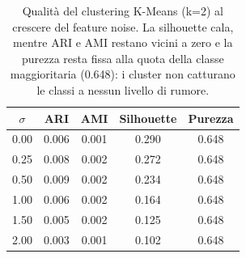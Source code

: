 \begin{table}[H]\centering\small
\caption{Qualità del clustering K-Means (k=2) al crescere del feature noise. La silhouette cala, mentre ARI e AMI restano vicini a zero e la purezza resta fissa alla quota della classe maggioritaria (0.648): i cluster non catturano le classi a nessun livello di rumore.}\label{tab:kmeans}
\begin{tabular}{c cccc}
\toprule
$\sigma$ & ARI & AMI & Silhouette & Purezza \\
\midrule
0.00 & 0.006 & 0.001 & 0.290 & 0.648 \\
0.25 & 0.008 & 0.002 & 0.272 & 0.648 \\
0.50 & 0.009 & 0.002 & 0.234 & 0.648 \\
1.00 & 0.006 & 0.002 & 0.164 & 0.648 \\
1.50 & 0.005 & 0.002 & 0.125 & 0.648 \\
2.00 & 0.003 & 0.001 & 0.102 & 0.648 \\
\bottomrule
\end{tabular}
\end{table}
